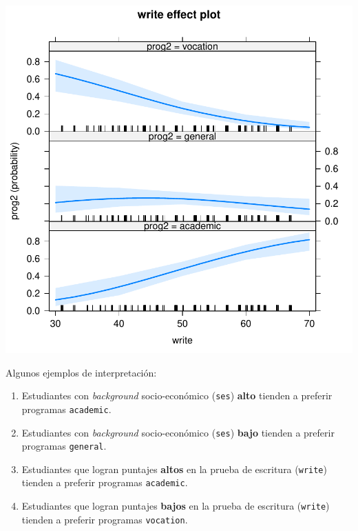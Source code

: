 \documentclass[onesided]{article}\usepackage[]{graphicx}\usepackage[]{color}
\makeatletter
\def\maxwidth{ %
  \ifdim\Gin@nat@width>\linewidth
    \linewidth
  \else
    \Gin@nat@width
  \fi
}
\makeatother
\begin{document}
{\centering \includegraphics[width=\maxwidth]{figure/pp-2} 

}




Algunos ejemplos de interpretaci\'on:

\begin{enumerate}
	\item Estudiantes con \emph{background} socio-econ\'omico (\texttt{ses}) {\bf alto} tienden a preferir programas \texttt{academic}.
	\item Estudiantes con \emph{background} socio-econ\'omico (\texttt{ses}) {\bf bajo} tienden a preferir programas \texttt{general}.
	\item Estudiantes que logran puntajes {\bf altos} en la prueba de escritura (\texttt{write}) tienden a preferir programas \texttt{academic}.
	\item Estudiantes que logran puntajes {\bf bajos} en la prueba de escritura (\texttt{write}) tienden a preferir programas \texttt{vocation}.
\end{enumerate}
\end{document}
